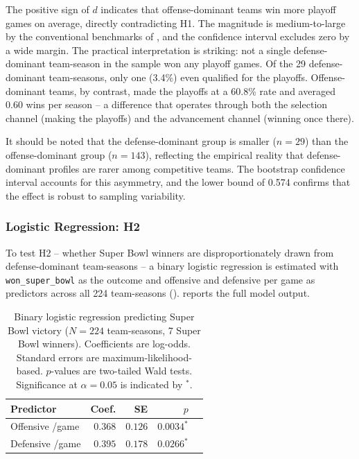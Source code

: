 The positive sign of $d$ indicates that offense-dominant teams win more playoff
games on average, directly contradicting H1. The magnitude is medium-to-large by
the conventional benchmarks of \textcite{cohen1988statisticalpower}, and the
confidence interval excludes zero by a wide margin. The practical interpretation
is striking: not a single defense-dominant team-season in the sample won any
playoff games. Of the 29 defense-dominant team-seasons, only one (3.4\%) even
qualified for the playoffs. Offense-dominant teams, by contrast, made the
playoffs at a 60.8\% rate and averaged 0.60 wins per season -- a difference that
operates through both the selection channel (making the playoffs) and the
advancement channel (winning once there).

It should be noted that the defense-dominant group is smaller ($n = 29$) than
the offense-dominant group ($n = 143$), reflecting the empirical reality that
defense-dominant profiles are rarer among competitive teams. The bootstrap
confidence interval accounts for this asymmetry, and the lower bound of 0.574
confirms that the effect is robust to sampling variability.

\subsubsection{Logistic Regression: H2}
\label{sec:logistic-results}

To test H2 -- whether Super Bowl winners are disproportionately drawn from
defense-dominant team-seasons -- a binary logistic regression is estimated with
\texttt{won\_super\_bowl} as the outcome and offensive and defensive \xvoa{}
per game as predictors across all 224 team-seasons
().  reports the full model
output.

\begin{table}[htbp]
  \centering
  \caption{Binary logistic regression predicting Super Bowl victory
           ($N = 224$ team-seasons, 7 Super Bowl winners). Coefficients are
           log-odds. Standard errors are maximum-likelihood-based.
           $p$-values are two-tailed Wald tests. Significance at
           $\alpha = 0.05$ is indicated by $^{*}$.}
  \label{tab:statistical-tests}
  \begin{tabular}{lrrrr}
    \toprule
    \textbf{Predictor} & \textbf{Coef.}
      & \textbf{SE}
      & \textbf{$p$} \\
    \midrule
    Offensive \xvoa{}/game & $0.368$ & $0.126$ & $0.0034^{*}$ \\
    Defensive \xvoa{}/game & $0.395$ & $0.178$ & $0.0266^{*}$ \\
    \bottomrule
  \end{tabular}
\end{table}

